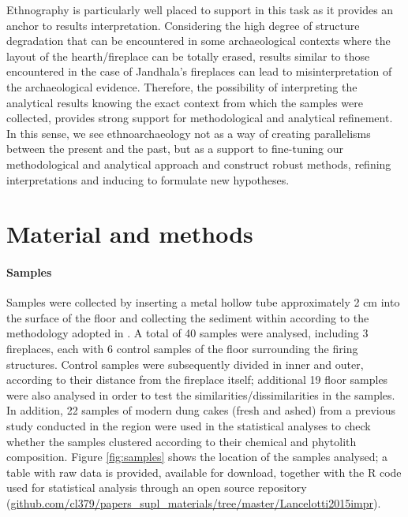 \documentclass[authoryear,preprint,review,12pt]{elsarticle}
\begin{document}
Ethnography is particularly well placed to support in this task as it provides an anchor to results interpretation. Considering the high degree of structure degradation that can be encountered in some archaeological contexts where the layout of the hearth/fireplace can be totally erased, results similar to those encountered in the case of Jandhala's fireplaces can lead to misinterpretation of the archaeological evidence. Therefore, the possibility of interpreting the analytical results knowing the exact context from which the samples were collected, provides strong support for methodological and analytical refinement. In this sense, we see ethnoarchaeology not as a way of creating parallelisms between the present and the past, but as a support to fine-tuning our methodological and analytical approach and construct robust methods, refining interpretations and inducing to formulate new hypotheses.

\section{Material and methods}
\label{sec:2}
\paragraph{Samples}
Samples were collected by inserting a metal hollow tube approximately 2 cm into the surface of the floor and collecting the sediment within according to the methodology adopted in \citet{Rondelli2014}. A total of 40 samples were analysed, including 3 fireplaces, each with 6 control samples of the floor surrounding the firing structures. Control samples were subsequently divided in inner and outer, according to their distance from the fireplace itself; additional 19 floor samples were also analysed in order to test the similarities/dissimilarities in the samples. In addition, 22 samples of modern dung cakes (fresh and ashed) from a previous study conducted in the region \citep{Lancelotti2012} were used in the statistical analyses to check whether the samples clustered according to their chemical and phytolith composition. Figure \ref{fig:samples} shows the location of the samples analysed; a table with raw data is provided, available for download, together with the R code used for statistical analysis through an open source repository (\url{github.com/cl379/papers_supl_materials/tree/master/Lancelotti2015impr}).
\end{document}
